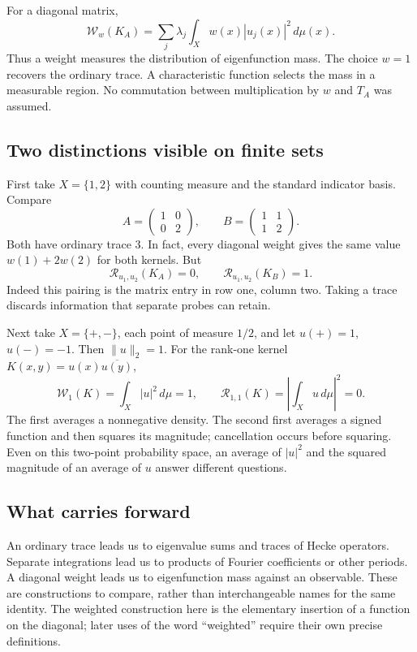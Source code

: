 For a diagonal matrix,
\[
\mathcal W_w(K_A)
=\sum_j\lambda_j\int_Xw(x)|u_j(x)|^2\,d\mu(x).
\]
Thus a weight measures the distribution of eigenfunction mass. The choice \(w=1\) recovers the ordinary trace. A characteristic function selects the mass in a measurable region. No commutation between multiplication by \(w\) and \(T_A\) was assumed.

\subsection{Two distinctions visible on finite sets}\label{finite-trace-information-examples}

First take \(X=\{1,2\}\) with counting measure and the standard indicator basis. Compare
\[
A=\begin{pmatrix}1&0\\0&2\end{pmatrix},
\qquad
B=\begin{pmatrix}1&1\\1&2\end{pmatrix}.
\]
Both have ordinary trace \(3\). In fact, every diagonal weight gives the same value \(w(1)+2w(2)\) for both kernels. But
\[
\mathcal R_{u_1,u_2}(K_A)=0,
\qquad
\mathcal R_{u_1,u_2}(K_B)=1.
\]
Indeed this pairing is the matrix entry in row one, column two. Taking a trace discards information that separate probes can retain.

Next take \(X=\{+,-\}\), each point of measure \(1/2\), and let \(u(+)=1\), \(u(-)=-1\). Then \(\|u\|_2=1\). For the rank-one kernel \(K(x,y)=u(x)\overline{u(y)}\),
\[
\mathcal W_1(K)=\int_X|u|^2\,d\mu=1,
\qquad
\mathcal R_{1,1}(K)=\left|\int_Xu\,d\mu\right|^2=0.
\]
The first averages a nonnegative density. The second first averages a signed function and then squares its magnitude; cancellation occurs before squaring. Even on this two-point probability space, an average of \(|u|^2\) and the squared magnitude of an average of \(u\) answer different questions.

\subsection{What carries forward}\label{finite-model-roadmap}

An ordinary trace leads us to eigenvalue sums and traces of Hecke operators. Separate integrations lead us to products of Fourier coefficients or other periods. A diagonal weight leads us to eigenfunction mass against an observable. These are constructions to compare, rather than interchangeable names for the same identity. The weighted construction here is the elementary insertion of a function on the diagonal; later uses of the word ``weighted'' require their own precise definitions.

